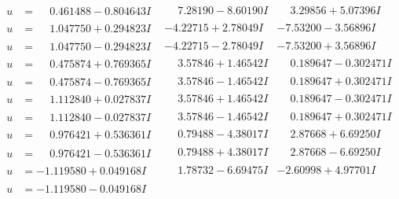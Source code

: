 \documentclass[1p]{elsarticle_modified}
\theoremstyle{definition}
\begin{document}
$$\begin{array}{c|c|c}
\begin{aligned}
u &= \phantom{-}0.461488 - 0.804643 I\end{aligned}
 & \phantom{-}7.28190 - 8.60190 I & \phantom{-}3.29856 + 5.07396 I \\ \hline\begin{aligned}
u &= \phantom{-}1.047750 + 0.294823 I\end{aligned}
 & -4.22715 + 2.78049 I & -7.53200 - 3.56896 I \\ \hline\begin{aligned}
u &= \phantom{-}1.047750 - 0.294823 I\end{aligned}
 & -4.22715 - 2.78049 I & -7.53200 + 3.56896 I \\ \hline\begin{aligned}
u &= \phantom{-}0.475874 + 0.769365 I\end{aligned}
 & \phantom{-}3.57846 + 1.46542 I & \phantom{-}0.189647 - 0.302471 I \\ \hline\begin{aligned}
u &= \phantom{-}0.475874 - 0.769365 I\end{aligned}
 & \phantom{-}3.57846 - 1.46542 I & \phantom{-}0.189647 + 0.302471 I \\ \hline\begin{aligned}
u &= \phantom{-}1.112840 + 0.027837 I\end{aligned}
 & \phantom{-}3.57846 + 1.46542 I & \phantom{-}0.189647 - 0.302471 I \\ \hline\begin{aligned}
u &= \phantom{-}1.112840 - 0.027837 I\end{aligned}
 & \phantom{-}3.57846 - 1.46542 I & \phantom{-}0.189647 + 0.302471 I \\ \hline\begin{aligned}
u &= \phantom{-}0.976421 + 0.536361 I\end{aligned}
 & \phantom{-}0.79488 - 4.38017 I & \phantom{-}2.87668 + 6.69250 I \\ \hline\begin{aligned}
u &= \phantom{-}0.976421 - 0.536361 I\end{aligned}
 & \phantom{-}0.79488 + 4.38017 I & \phantom{-}2.87668 - 6.69250 I \\ \hline\begin{aligned}
u &= -1.119580 + 0.049168 I\end{aligned}
 & \phantom{-}1.78732 - 6.69475 I & -2.60998 + 4.97701 I \\ \hline\begin{aligned}
u &= -1.119580 - 0.049168 I\end{aligned}

\end{array}$$
\end{document}
